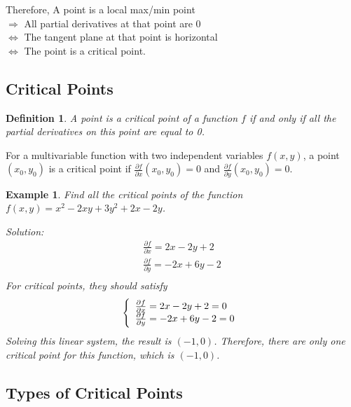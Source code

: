 \documentclass{article}
\newtheorem*{definition}{Definition}
\newtheorem{example}{Example}
\begin{document}
Therefore, A point is a local max/min point \\
$\Rightarrow$ All partial derivatives at that point are 0 \\
$\iff$ The tangent plane at that point is horizontal \\
$\iff$ The point is a critical point.

\subsection{Critical Points}

\begin{definition}
  A point is a critical point of a function $f$ if and only if all the partial 
  derivatives on this point are equal to 0.
\end{definition}
For a multivariable function with two independent variables $f(x, y)$, a point 
$(x_0, y_0)$ is a critical point if 
$\frac{\partial f}{\partial x}(x_0, y_0) = 0$ and 
$\frac{\partial f}{\partial y}(x_0, y_0) = 0$.

\begin{example}
  Find all the critical points of the function 
  $f(x, y) = x^2 - 2xy + 3y^2 + 2x - 2y$.

  Solution: \\
  \begin{gather*}
    \frac{\partial f}{\partial x} = 2x - 2y + 2 \\
    \frac{\partial f}{\partial y} = -2x + 6y - 2 \\
  \end{gather*}
  For critical points, they should satisfy 
  \begin{equation*}
    \left\{ \begin{array}{ll}
      \frac{\partial f}{\partial x} = 2x - 2y + 2 = 0 \\
      \frac{\partial f}{\partial y} = -2x + 6y - 2 = 0 \\
    \end{array} \right. \\
  \end{equation*}
  Solving this linear system, the result is $(-1, 0)$. Therefore, there are only 
  one critical point for this function, which is $(-1, 0)$.
\end{example}

\subsection{Types of Critical Points}
\end{document}
